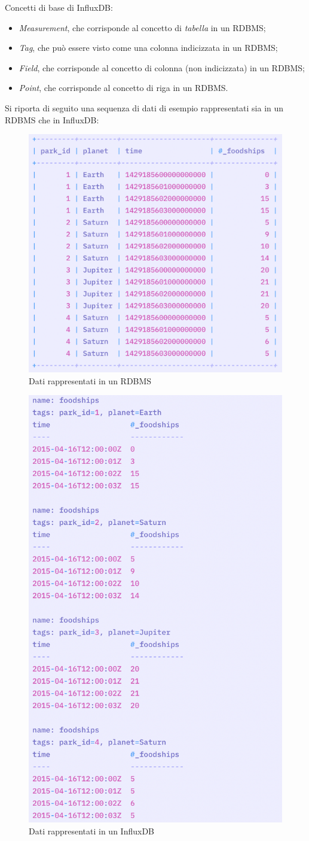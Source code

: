 \documentclass{article}
\begin{document}
\bigskip
\noindent
Concetti di base di InfluxDB:
\begin{itemize}[noitemsep]
    \item \textit{Measurement}, che corrisponde al concetto di \textit{tabella} in un RDBMS;
    \item \textit{Tag}, che può essere visto come una colonna indicizzata in un RDBMS;
    \item \textit{Field}, che corrisponde al concetto di colonna (non indicizzata) in un RDBMS;
    \item \textit{Point}, che corrisponde al concetto di riga in un RDBMS.
\end{itemize}

\smallskip
\noindent
Si riporta di seguito una sequenza di dati di esempio rappresentati sia in un RDBMS che in InfluxDB:
\begin{figure}[H]
\includegraphics[width=0.55\linewidth]{Data-RDBMS}
\centering
\caption*{Dati rappresentati in un RDBMS}
\label{fig:bytepost}
\end{figure}

\begin{figure}[H]
\includegraphics[width=0.55\linewidth]{Data-InfluxDB}
\centering
\caption*{Dati rappresentati in un InfluxDB}
\label{fig:bytepost}
\end{figure}
\end{document}
